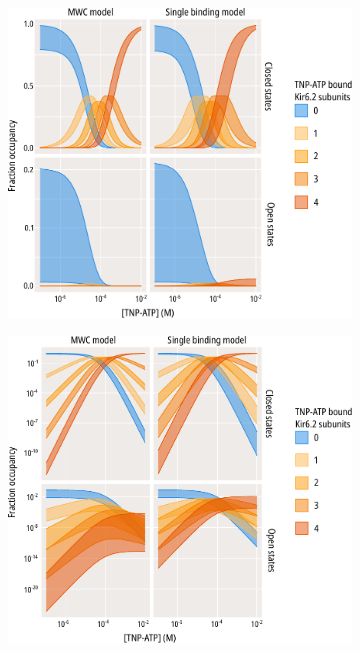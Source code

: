\begin{figure}[h]
	\centering
	\begin{subfigure}[t]{0.45\textwidth}
		\caption{}\label{ch4fig:w311_states_weights_1}
		\centering
		\includegraphics[width=\textwidth]{weighted_states.pdf}
	\end{subfigure}
	\hfill
	\begin{subfigure}[t]{0.45\textwidth}
		\caption{}\label{ch4fig:w311_states_weights_2}
		\centering
		\includegraphics[width=\textwidth]{weighted_states_2.pdf}

\end{subfigure}
\end{figure}
